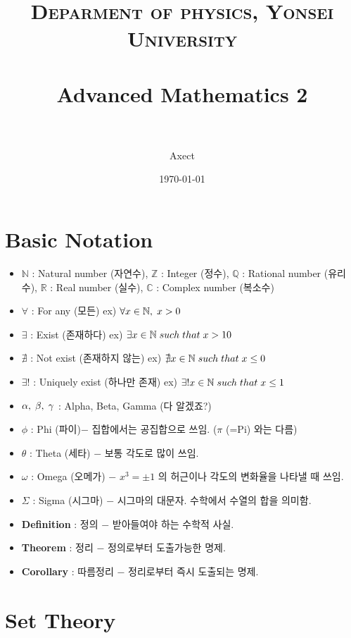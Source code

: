 \documentclass[paper=a4, fontsize=11pt]{scrartcl} %
\title{	
\normalfont \normalsize 
\textsc{Deparment of physics, Yonsei University} \\ [25pt] %
\horrule{0.5pt} \\[0.4cm] %
\huge Advanced Mathematics 2\\ %
\horrule{2pt} \\[0.5cm] %
}
\author{Axect} %
\date{\normalsize\today} %
\numberwithin{equation}{section} %
\numberwithin{figure}{section} %
\numberwithin{table}{section} %
\theoremstyle{plain}
\newcommand{\Com}{,\Hs}
\newcommand{\Hs}{\hspace{0.1cm}}
\newcommand{\HS}{\hspace{0.5cm}}
\newcommand{\VS}{\vspace{0.3cm}}
\newcommand{\N}{\mathbb{N}}
\newcommand{\Z}{\mathbb{Z}}
\newcommand{\Q}{\mathbb{Q}}
\newcommand{\R}{\mathbb{R}}
\newcommand{\C}{\mathbb{C}}
\begin{document}
\maketitle %


\section{Basic Notation}
\VS\VS
\begin{itemize}
 \item $\N$ : Natural number (자연수), $\Z$ : Integer (정수), $\Q$ : Rational number (유리수), \newline
 $\R$ : Real number (실수), $\C$ : Complex number (복소수)
 \item $\forall$ : For any (모든) \HS ex) $\forall x \in \N \Com x>0$
 \item $\exists$ : Exist (존재하다) \HS ex) $\exists x \in \N \Hs such \Hs that \Hs x>10$
 \item $\nexists$ : Not exist (존재하지 않는) \HS ex) $\nexists x \in \N \Hs such \Hs that\Hs x \leq 0$
 \item $\exists !$ : Uniquely exist (하나만 존재) \HS ex) $\exists ! x \in \N \Hs such \Hs that \Hs x \leq 1$
 \item $\alpha\Com\beta\Com\gamma$ : Alpha, Beta, Gamma (다 알겠죠?)
 \item $\phi$ : Phi (파이)$ -$ 집합에서는 공집합으로 쓰임. ($\pi$ (=Pi) 와는 다름)
 \item $\theta$ : Theta (세타) $-$ 보통 각도로 많이 쓰임.
 \item $\omega$ : Omega (오메가) $-$ \Hs $x^3 = \pm 1$ 의 허근이나 각도의 변화율을 나타낼 때 쓰임.
 \item $\Sigma$ : Sigma (시그마) $-$ 시그마의 대문자. 수학에서 수열의 합을 의미함.
 \item \textbf{Definition} : 정의 $-$ 받아들여야 하는 수학적 사실.
 \item \textbf{Theorem} : 정리 $-$ 정의로부터 도출가능한 명제.
 \item \textbf{Corollary} : 따름정리 $-$ 정리로부터 즉시 도출되는 명제. 
\end{itemize}

\pagebreak

\section{Set Theory}
\end{document}
